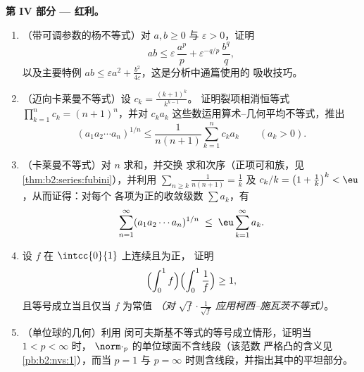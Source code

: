\begin{problem}
\medskip
\noindent\textbf{第 IV 部分 --- 红利。}
\begin{enumerate}[resume]
  \item （带可调参数的杨不等式）对 $a, b \geq 0$ 与 $\varepsilon >
        0$，证明
        \[
        ab \leq \varepsilon\,\frac{a^p}{p} +
        \varepsilon^{-q/p}\,\frac{b^q}{q},
        \]
        以及主要特例 $ab \leq \varepsilon a^2 +
        \frac{b^2}{4\varepsilon}$，这是分析中通篇使用的
        吸收技巧。
  \item （迈向卡莱曼不等式）设 $c_k = \frac{(k+1)^k}{k^{k-1}}$。
        证明裂项相消恒等式 $\prod_{k=1}^{n}c_k =
        (n+1)^n$，并对
        $c_ka_k$ 这些数运用算术--几何平均不等式，推出
        \[
        (a_1a_2\cdots a_n)^{1/n} \leq
        \frac{1}{n(n+1)}\sum_{k=1}^{n} c_k a_k
        \qquad (a_k > 0).
        \]
  \item （卡莱曼不等式）对 $n$ 求和，并交换
        求和次序（正项可和族，见
        \cref{thm:b2:series:fubini}），并利用 $\sum_{n \geq
        k}\frac{1}{n(n+1)} = \frac1k$ 及 $c_k/k = \bigl(1 +
        \frac1k\bigr)^k < \eu$，从而证得：对每个
        各项为正的收敛级数 $\sum a_k$，有
        \[
        \sum_{n=1}^{\infty}(a_1a_2\cdots a_n)^{1/n}
        \;\leq\; \eu\sum_{k=1}^{\infty}a_k .
        \]
  \item 设 $f$ 在 $\intcc{0}{1}$ 上连续且为正，
        证明
        \[
        \Bigl(\int_0^1 f\Bigr)\Bigl(\int_0^1\frac1f\Bigr)
        \geq 1,
        \]
        且等号成立当且仅当 $f$ 为常值
        \emph{（对 $\sqrt f\cdot\frac1{\sqrt
        f}$ 应用柯西--施瓦茨不等式）}。
  \item （单位球的几何）利用
        闵可夫斯基不等式的等号成立情形，证明当 $1 < p < \infty$ 时，
        $\norm\cdot_p$ 的单位球面不含线段（该范数
        严格凸的含义见
        \cref{pb:b2:nvs:1}），而当 $p = 1$ 与 $p =
        \infty$ 时则含线段，并指出其中的平坦部分。
\end{enumerate}


\end{problem}
